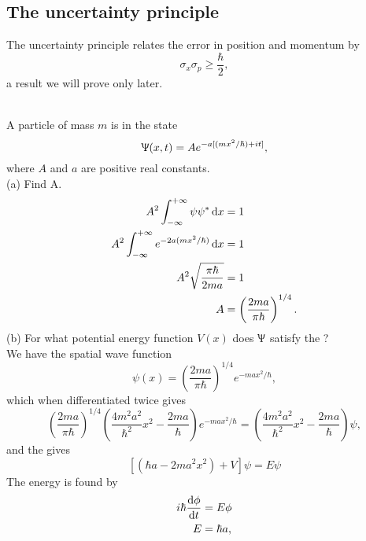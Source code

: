 \subsection{The uncertainty principle}
\begin{thrm}
The uncertainty principle relates the error in position and momentum by
\begin{equation}
\sigma_x\sigma_p\geq\frac{\hbar}{2}, 
\end{equation}
a result we will prove only later. 
\end{thrm}
\begin{wex}
\ \\
A particle of mass $m$ is in the state 
\begin{equation}
\Uppsi(x,t)=Ae^{-a[(mx^2/\hbar)+it]}, 
\end{equation}
where $A$ and $a$ are positive real constants. \\
(a) Find A. \\
\begin{subequations}
\begin{align}
A^2\intinf\psi\psi^*\dx&=1 \\
A^2\intinf e^{-2a(mx^2/\hbar)}\dx&=1 \\
A^2\sqrt{\frac{\pi\hbar}{2ma}}&=1\\
A&=\left(\frac{2ma}{\pi\hbar} \right)^{1/4}. 
\end{align}
\end{subequations}
(b) For what potential energy function $V(x)$ does $\Uppsi$ satisfy the \sch?\\
We have the spatial wave function
\begin{equation}
\psi(x)=\left(\frac{2ma}{\pi\hbar} \right)^{1/4}e^{-max^2/\hbar}, 
\end{equation}
which when differentiated twice gives 
\begin{equation}
\left(\frac{2ma}{\pi\hbar} \right)^{1/4}\left(\frac{4m^2a^2}{\hbar^2}x^2-\frac{2ma}{\hbar} \right)e^{-max^2/\hbar}=\left(\frac{4m^2a^2}{\hbar^2}x^2-\frac{2ma}{\hbar} \right)\psi,
\end{equation}
and the \sch gives 
\begin{equation}
\left[\left(\hbar a-2ma^2x^2 \right)+V\right]\psi=E\psi
\end{equation}
The energy is found by
\begin{subequations}
\begin{align}
i\hbar\diff{\phi}{t}&=E\phi\\
E&=\hbar a,
\end{align}

\end{subequations}
\end{wex}
